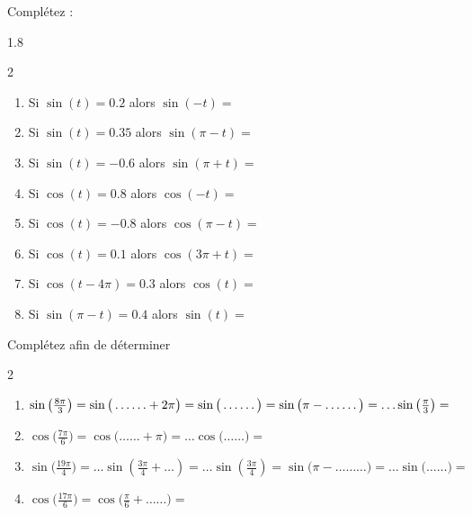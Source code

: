 \documentclass[main.tex]{subfiles}
\begin{document}
\begin{exercise} Complétez : 
\vspace{-1em}
\begin{spacing}{1.8}
	\begin{multicols}{2} 
\begin{enumerate}[label={\arabic*)},leftmargin=*]
	\item Si $\sin(t)=0.2$ alors $\sin(-t)=$\dotfill 
	\item Si $\sin(t)=0.35$ alors $\sin(\pi-t)=$\dotfill 
	\item Si $\sin(t)=-0.6$ alors $\sin(\pi+t)=$\dotfill 
	\item Si $\cos(t)=0.8$ alors $\cos(-t)=$\dotfill 
	\item Si $\cos(t)=-0.8$ alors $\cos(\pi-t)=$\dotfill 
	\item Si $\cos(t)=0.1$ alors $\cos(3\pi+t)=$\dotfill
	\item Si  $\cos(t-4\pi)=0.3$ alors $\cos(t)=$\dotfill
	\item Si  $\sin(\pi-t)=0.4$ alors $\sin(t)=$\dotfill  
\end{enumerate} 
	\end{multicols}\vspace{-2.25em}
\end{spacing}
\end{exercise}
\begin{exercise} Complétez afin de déterminer 
	\vspace{-0.5em}
	\begin{spacing}{2}
	\begin{enumerate}[label={\alph*)},leftmargin=*] 
		\item   $\sin\big(\tfrac{8\pi}{3}\big)= \sin\big(\ldots\ldots+2\pi\big) = \sin\big(\ldots\ldots\big)=\sin\big(\pi-\ldots\ldots\big) =\ldots \sin\big(\tfrac{\pi}{3}\big) =\dotfill $ 
		\item $\cos\big(\tfrac{7\pi}{6}\big)= \cos\big(\ldots\ldots+\pi\big) =\ldots\cos\big(\ldots\ldots\big)=$\dotfill
		\item $\sin\big(\tfrac{19\pi}{4}\big)=\ldots\sin(\tfrac{3\pi}{4}+\ldots)=\ldots\sin(\tfrac{3\pi}{4})=\sin\big(\pi-\ldots\ldots\ldots\big)=\ldots\sin\big(\ldots\ldots\big)=$\dotfill
		\item $\cos\big(\tfrac{17\pi}{6}\big)= \cos\big(\tfrac{\pi}{6}+\ldots\ldots \big) = $\dotfill
	\end{enumerate}\vspace{-2em}
\end{spacing}  
\end{exercise}
\end{document}
